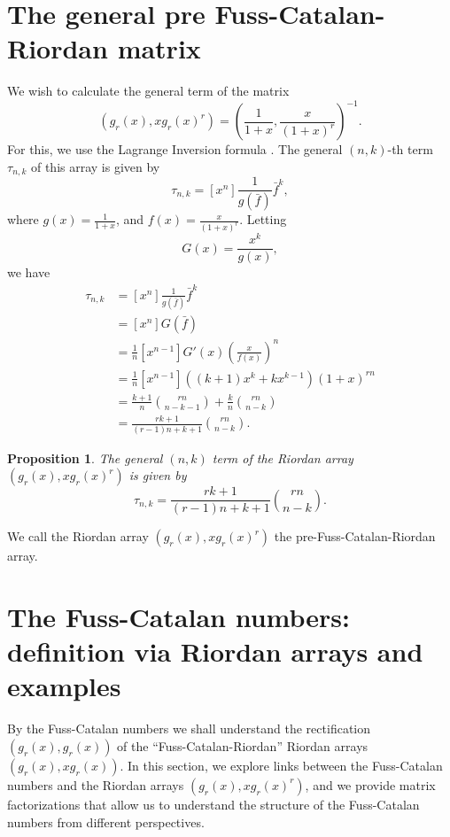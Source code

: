 \documentclass[12pt,reqno]{article}
\newtheorem{proposition}[theorem]{Proposition}
\theoremstyle{definition}
\begin{document}
\section{The general pre Fuss-Catalan-Riordan matrix}
We wish to calculate the general term of the matrix
$$(g_r(x), xg_r(x)^r)=\left(\frac{1}{1+x}, \frac{x}{(1+x)^r}\right)^{-1}.$$ For this, we use the Lagrange Inversion formula \cite{LI}. The general $(n,k)$-th term $\tau_{n,k}$ of this array is given by
$$\tau_{n,k}=[x^n] \frac{1}{g(\bar{f})} \bar{f}^k,$$ where $g(x)=\frac{1}{1+x}$, and $f(x)=\frac{x}{(1+x)^r}$. Letting
$$G(x)=\frac{x^k}{g(x)},$$ we have
\begin{align*}\tau_{n,k}&=[x^n] \frac{1}{g(\bar{f})} \bar{f}^k\\
&=[x^n]G(\bar{f})\\
&=\frac{1}{n}[x^{n-1}] G'(x)\left(\frac{x}{f(x)}\right)^n\\
&=\frac{1}{n}[x^{n-1}]((k+1)x^k+kx^{k-1})(1+x)^{rn}\\
&=\frac{k+1}{n}\binom{rn}{n-k-1}+\frac{k}{n}\binom{rn}{n-k}\\
&=\frac{rk+1}{(r-1)n+k+1}\binom{rn}{n-k}.\end{align*}
\begin{proposition} The general $(n,k)$ term of the Riordan array $(g_r(x), xg_r(x)^r)$ is given by
$$\tau_{n,k}=\frac{rk+1}{(r-1)n+k+1}\binom{rn}{n-k}.$$
\end{proposition}
We call the Riordan array $\left(g_r(x), xg_r(x)^r\right)$ the pre-Fuss-Catalan-Riordan array.

\section{The Fuss-Catalan numbers: definition via Riordan arrays and examples}
By the Fuss-Catalan numbers we shall understand the rectification $(g_r(x), g_r(x))$ of the ``Fuss-Catalan-Riordan'' Riordan arrays $(g_r(x), xg_r(x))$. In this section, we explore links between the Fuss-Catalan numbers and the Riordan arrays $(g_r(x), xg_r(x)^r)$, and we provide matrix factorizations that allow us to understand the structure of the Fuss-Catalan numbers from different perspectives.
\end{document}
